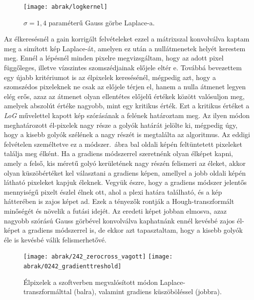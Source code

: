 \documentclass[a4paper,12pt]{article}
\begin{document}
\begin{figure}[htbp]
\center
\texttt{[image: abrak/logkernel]}
\caption{$\sigma = 1,\!4$ paraméterű Gauss görbe Laplace-a.}
\label{fig:logkernel}
\end{figure}


Az élkeresésnél a gain korrigált felvételeket ezzel a mátrixszal konvolválva kaptam meg a simított kép Laplace-át, amelyen ez után a nullátmenetek helyét kerestem meg. Ennél a lépésnél minden pixelre megvizsgáltam, hogy az adott pixel függőleges, illetve vízszintes szomszédjainak előjele eltér e. Továbbá bevezettem egy újabb kritériumot is az  élpixelek keresésénél, mégpedig azt, hogy a szomszédos pixeleknek ne csak az előjele térjen el, hanem a nulla átmenet legyen elég erős, azaz az átmenet olyan ellentétes előjelű értékek között valósuljon meg, amelyek abszolút értéke nagyobb, mint egy kritikus érték. Ezt a kritikus értéket a \emph{LoG} művelettel kapott kép szórásának a felének határoztam meg. Az ilyen módon meghatározott él-pixelek nagy része a golyók határát jelölte ki, mégpedig úgy, hogy a kisebb golyók szélének a nagy részét is megtalálta az algoritmus. Az eddigi felvételen személtetve ez a módszer.~ábra bal oldali képén feltüntetett pixeleket találja meg élként. Ha a gradiens módszerrel szeretnénk olyan élképet kapni, amely a felső, kis méretű golyó kerületének nagy részén felismeri az éleket, akkor olyan küszöbértéket kel választani a gradiens képen, amellyel a jobb oldali képén látható pixeleket kapjuk éleknek. Vegyük észre, hogy a gradiens módszer jelentős mennyiségű pixelt észlel élnek ott, ahol a plexi határa található, és a kép hátterében is zajos képet ad. Ezek a tényezők rontják a Hough-transzformált minőségét és növelik a futási idejét. Az eredeti képet jobban elmosva, azaz nagyobb szórású Gauss görbével konvolválva kaphatnánk ennél kevésbé zajos él-képet a gradiens módszerrel is, de ekkor azt tapasztaltam, hogy a kisebb golyók éle is kevésbé válik felismerhetővé. 


\begin{figure}[htbp]
\center
\texttt{[image: abrak/242\_zerocross\_vagott]}
\texttt{[image: abrak/0242\_gradienttreshold]}
\caption{Élpixelek a szoftverben megvalósított módon Laplace-transzformálttal (balra), valamint gradiens küszöböléssel (jobbra).}
\label{fig:242_circles}
\end{figure}
\end{document}
